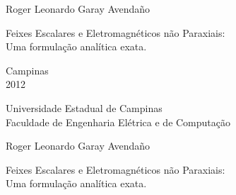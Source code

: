 \vspace*{2.0cm}
\begin{center}
\large Roger Leonardo Garay Avenda\~no
\end{center}


\vspace*{6.8cm}

\begin{center}
{\sc \Large   Feixes Escalares e Eletromagnéticos não Paraxiais: \\ 
 }{\sc \Large   Uma formulação analítica exata. \\ 
 }
\end{center}

\vspace*{3.25cm}


\null \vfill

\begin{center}
Campinas\\2012
\end{center}
\newpage


\begin{center}
\large Universidade Estadual de Campinas\\
Faculdade de Engenharia Elétrica e de Computação
\end{center}

\vspace*{1.5cm}
\begin{center}
\large Roger Leonardo Garay Avenda\~no
\end{center}


\vspace*{2.3cm}

\begin{center}
{\sc \Large   Feixes Escalares e Eletromagnéticos não Paraxiais: \\ 
 }{\sc \Large   Uma formulação analítica exata. \\ 
 }
\end{center}

